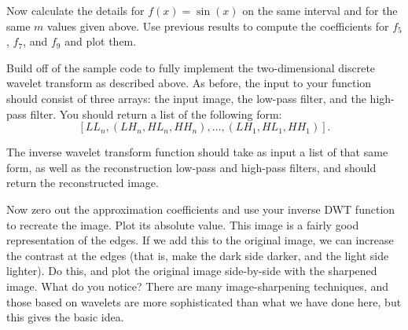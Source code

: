 Now calculate the details for $f(x) = \sin(x)$ on the same interval and for the
same $m$ values given above. Use previous results to compute the coefficients
for $f_5$, $f_7$, and $f_9$ and plot them.

Build off of the sample code to fully implement the two-dimensional discrete
wavelet transform as described above.
As before, the input to your function should consist of
three arrays: the input image, the low-pass filter, and the high-pass filter.
You should return a list of the following form: $$[LL_n,(LH_n,HL_n,HH_n), \ldots
,(LH_1,HL_1,HH_1)].$$

The inverse wavelet transform function should take as input a list
of that same form, as well as the reconstruction low-pass and high-pass filters,
and should return the reconstructed image.

Now zero out the approximation coefficients and use your inverse DWT
function to recreate the image. Plot its absolute value. This image is
a fairly good representation of the edges. If we add this to the original
image, we can increase the contrast at the edges (that is, make the dark
side darker, and the light side lighter). Do this, and plot the original
image side-by-side with the sharpened image. What do you notice? There
are many image-sharpening techniques, and those based on wavelets
are more sophisticated than what we have done here, but this gives the
basic idea.
